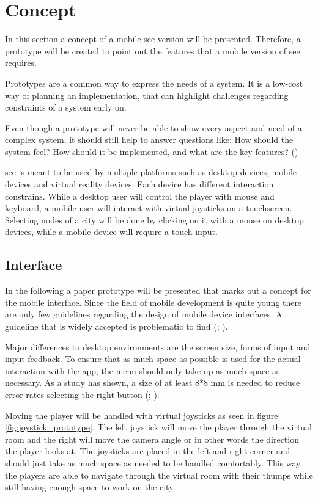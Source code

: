 \section{Concept}
\label{section:concept}
In this section a concept of a mobile \gls{see} version will be presented. 
Therefore, a prototype will be created to point out the features that a mobile version of \gls{see} requires.

Prototypes are a common way to express the needs of a system. 
It is a low-cost way of planning an implementation, that can highlight challenges regarding constraints of a system early on.

Even though a prototype will never be able to show every aspect and need of a complex system, it should still help to answer questions like: 
How should the system feel? How should it be implemented, and what are the key features? (\cite{houde1997prototypes}) 

\gls{see} is meant to be used by multiple platforms such as desktop devices, mobile devices and virtual reality devices.
Each device has different interaction constrains. 
While a desktop user will control the player with mouse and keyboard, a mobile user will interact with virtual joysticks on a touchscreen.
Selecting \glspl{node} of a \gls{city} will be done by clicking on it with a mouse on desktop devices, while a mobile device will require a touch input.

\subsection{Interface}
\label{sec:interface}
In the following a paper prototype will be presented that marks out a concept for the mobile interface.
Since the field of mobile development is quite young there are only few guidelines regarding the design of mobile device interfaces.
A guideline that is widely accepted is problematic to find (\cite{renaud2017demarcating}; \cite{punchoojit2017usability}). 

Major differences to desktop environments are the screen size, forms of input and input feedback.
To ensure that as much space as possible is used for the actual interaction with the app, the menu should only take up as much space as necessary.
As a study has shown, a size of at least 8*8 mm is needed to reduce error rates selecting the right button (\cite{conradi2015optimal}; \cite{parhi2006target}).

Moving the player will be handled with virtual joysticks as seen in figure \ref{fig:joystick_prototype}.
The left joystick will move the player through the virtual room and the right will move the camera angle or in other words the direction the player looks at.
The joysticks are placed in the left and right corner and should just take as much space as needed to be handled comfortably.
This way the players are able to navigate through the virtual room with their thumps while still having enough space to work on the \gls{city}.

